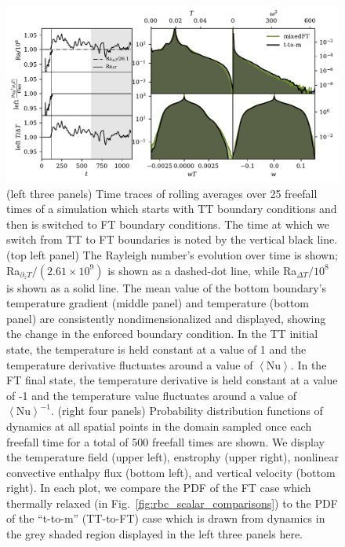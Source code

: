 \documentclass[aps, pre, onecolumn, nofootinbib, notitlepage, groupedaddress, amsfonts, amssymb, amsmath, longbibliography, superscriptaddress]{revtex4-1}
\newcommand{\angles}[1]{\ensuremath{\left\langle #1 \right\rangle}}
\begin{document}
\begin{figure}
\includegraphics[width=\textwidth]{./figs/rbc_restart_description.pdf}
\caption{ 
	(left three panels) Time traces of rolling averages over 25 freefall times of a simulation which starts with TT boundary conditions and then is switched to FT boundary conditions.
	The time at which we switch from TT to FT boundaries is noted by the vertical black line.
	(top left panel) The Rayleigh number's evolution over time is shown; Ra$_{\partial_z T}/(2.61\times 10^9)$ is shown as a dashed-dot line, while Ra$_{\Delta T}/10^8$ is shown as a solid line.
	The mean value of the bottom boundary's temperature gradient (middle panel) and temperature (bottom panel) are consistently nondimensionalized and displayed, showing the change in the enforced boundary condition.
	In the TT initial state, the temperature is held constant at a value of 1 and the temperature derivative fluctuates around a value of $\angles{\text{Nu}}$.
	In the FT final state, the temperature derivative is held constant at a value of -1 and the temperature value fluctuates around a value of $\angles{\text{Nu}}^{-1}$.
	(right four panels) Probability distribution functions of dynamics at all spatial points in the domain sampled once each freefall time for a total of 500 freefall times are shown.
	We display the temperature field (upper left), enstrophy (upper right), nonlinear convective enthalpy flux (bottom left), and vertical velocity (bottom right).
	In each plot, we compare the PDF of the FT case which thermally relaxed (in Fig.~\ref{fig:rbc_scalar_comparisons}) to the PDF of the ``t-to-m'' (TT-to-FT) case which is drawn from dynamics in the grey shaded region displayed in the left three panels here.
\label{fig:rbc_restart_description} }
\end{figure}
\end{document}
